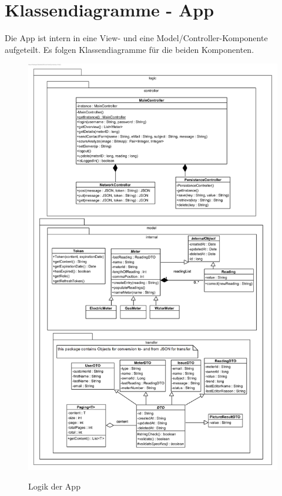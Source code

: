 \section{Klassendiagramme - App}
Die App ist intern in eine View- und eine Model/Controller-Komponente aufgeteilt. Es folgen Klassendiagramme für die beiden Komponenten.
\begin{figure}[H]
\centering
\includegraphics[scale=0.97]{img/diagrams/Android-Class-Diagram-Logic}\\
\caption{Logik der App}
\end{figure}


